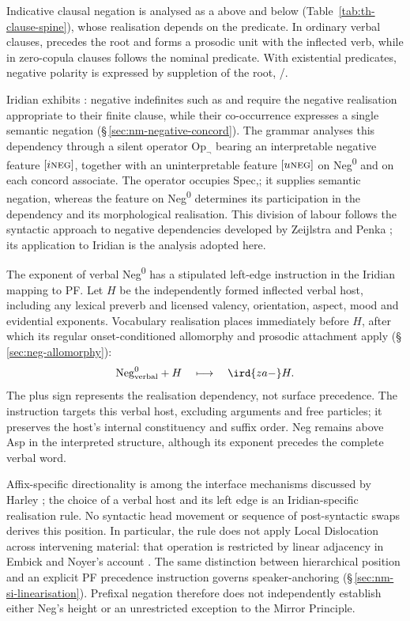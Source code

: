 Indicative clausal negation is analysed as a  above
 and below 
(Table~\ref{tab:th-clause-spine}), whose realisation depends on the predicate.
In ordinary verbal clauses,  precedes the root and forms a prosodic
unit with the inflected verb, while in zero-copula clauses  follows
the nominal predicate. With existential predicates, negative polarity is
expressed by suppletion of the root, /.

Iridian exhibits : negative indefinites such as
  and   require the
negative realisation appropriate to their finite clause, while their
co-occurrence expresses a single semantic negation
(§\,\ref{sec:nm-negative-concord}). The grammar analyses this dependency through
a silent operator $\mathrm{Op}_{\neg}$ bearing an interpretable negative
feature $[i\textsc{neg}]$, together with an uninterpretable feature
$[u\textsc{neg}]$ on Neg\textsuperscript{0} and on each concord associate.
The operator occupies Spec,; it supplies semantic negation,
whereas the feature on Neg\textsuperscript{0} determines its participation in
the dependency and its morphological realisation. This division of labour
follows the syntactic approach to negative dependencies developed by
Zeijlstra and Penka \cite{zeijlstra2022,penka2011}; its application to Iridian is the analysis
adopted here.

The exponent of verbal Neg\textsuperscript{0} has a stipulated left-edge
instruction in the Iridian mapping to PF. Let $H$ be the independently formed
inflected verbal host, including any lexical preverb and licensed valency,
orientation, aspect, mood and evidential exponents. Vocabulary realisation
places  immediately before $H$, after which its regular onset-conditioned
allomorphy and prosodic attachment apply (§\,\ref{sec:neg-allomorphy}):
\[
 \mathrm{Neg}^{0}_{\text{verbal}}+H
 \quad\longmapsto\quad \ird{za-}H.
\]
The plus sign represents the realisation dependency, not surface precedence.
The instruction targets this verbal host, excluding arguments and free
particles; it preserves the host's internal constituency and suffix order.
Neg remains above Asp in the interpreted structure, although its exponent
precedes the complete verbal word.

Affix-specific directionality is among the interface mechanisms discussed by
Harley \cite{harley2011}; the choice of a verbal host and its left edge is an
Iridian-specific realisation rule. No syntactic head movement or sequence of
post-syntactic swaps derives this position. In particular, the rule does not
apply Local Dislocation across intervening material: that operation is
restricted by linear adjacency in Embick and Noyer's account
\cite{embicknoyer2007}. The same distinction between hierarchical position and
an explicit PF precedence instruction governs speaker-anchoring 
(§\,\ref{sec:nm-si-linearisation}). Prefixal negation therefore does not
independently establish either Neg's height or an unrestricted exception to
the Mirror Principle.

